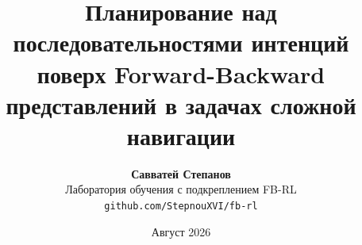 \documentclass[10pt,twocolumn,letterpaper]{article}
\title{\LARGE \bfseries Планирование над последовательностями интенций поверх Forward-Backward представлений в задачах сложной навигации}
\author{\textbf{Савватей Степанов} \\ Лаборатория обучения с подкреплением FB-RL \\ \texttt{github.com/StepnouXVI/fb-rl}}
\date{Август 2026}
\begin{document}
\maketitle

\begin{abstract}
\end{abstract}










\end{document}
